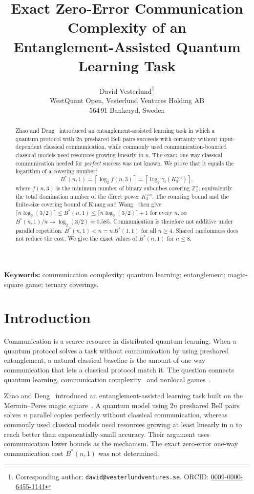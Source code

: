 \documentclass[12pt,a4paper]{article}
\title{Exact Zero-Error Communication Complexity of an\\
Entanglement-Assisted Quantum Learning Task}
\author{%
  David Vesterlund\thanks{Corresponding author: \texttt{david@vesterlundventures.se}. ORCID: \href{https://orcid.org/0009-0000-6455-1141}{0009-0000-6455-1141}} \\
  WestQuant Open, Vesterlund Ventures Holding AB \\
  564\,91 Bankeryd, Sweden
}
\date{}
\theoremstyle{definition}
\theoremstyle{remark}
\newcommand{\Z}{\mathbb{Z}}
\newcommand{\gammat}{\gamma_t}
\newcommand{\Bstar}{B^{*}}
\begin{document}
\maketitle

\begin{abstract}
Zhao and Deng~\cite{zhaodeng2025} introduced an entanglement-assisted learning task in which a quantum protocol with $2n$ preshared Bell pairs succeeds with certainty without input-dependent classical communication, while commonly used communication-bounded classical models need resources growing linearly in $n$. The exact one-way classical communication needed for \emph{perfect} success was not known. We prove that it equals the logarithm of a covering number:
\[
  \Bstar(n,1) = \left\lceil \log_2 f(n,3) \right\rceil = \left\lceil \log_2 \gammat(K_3^{\times n}) \right\rceil,
\]
where $f(n,3)$ is the minimum number of binary subcubes covering $\Z_3^n$, equivalently the total domination number of the direct power $K_3^{\times n}$. The counting bound and the finite-size covering bound of Kuang and Wang~\cite{kuangwang2026} then give $\lceil n\log_2(3/2)\rceil \le \Bstar(n,1) \le \lceil n\log_2(3/2)\rceil + 1$ for every $n$, so $\Bstar(n,1)/n \to \log_2(3/2) \approx 0.585$. Communication is therefore not additive under parallel repetition: $\Bstar(n,1) < n = n\,\Bstar(1,1)$ for all $n \ge 4$. Shared randomness does not reduce the cost. We give the exact values of $\Bstar(n,1)$ for $n \le 8$.
\end{abstract}
\noindent\textbf{Keywords:} communication complexity; quantum learning; entanglement; magic-square game; ternary coverings.

\section{Introduction}
\label{sec:intro}

Communication is a scarce resource in distributed quantum learning. When a quantum protocol solves a task without communication by using preshared entanglement, a natural classical baseline is the amount of one-way communication that lets a classical protocol match it. The question connects quantum learning, communication complexity~\cite{buhrman2010} and nonlocal games~\cite{cleve2004,brassard2005}.

Zhao and Deng~\cite{zhaodeng2025} introduced an entanglement-assisted learning task built on the Mermin--Peres magic square~\cite{mermin1990,peres1990}. A quantum model using $2n$ preshared Bell pairs solves $n$ parallel copies perfectly without classical communication, whereas commonly used classical models need resources growing at least linearly in $n$ to reach better than exponentially small accuracy. Their argument uses communication lower bounds as the mechanism. The exact zero-error one-way communication cost $\Bstar(n,1)$ was not determined.
\end{document}
